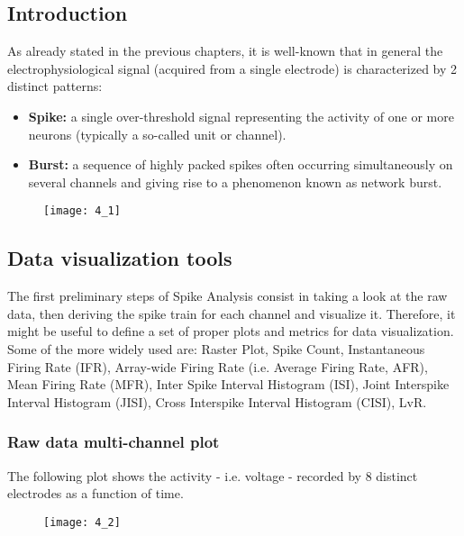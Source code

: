 \subsection{Introduction}
As already stated in the previous chapters, it is well-known that in general the electrophysiological
signal (acquired from a single electrode) is characterized by 2 distinct patterns:
\begin{itemize}
    \item \textbf{Spike:} a single over-threshold signal representing the activity of one or
          more neurons (typically a so-called unit or channel).
    \item \textbf{Burst:} a sequence of highly packed spikes often occurring simultaneously on
          several channels and giving rise to a phenomenon known as network burst.
\end{itemize}
\begin{figure}[H]
    \texttt{[image: 4\_1]}
    \centering
\end{figure}


\subsection{Data visualization tools}
The first preliminary steps of Spike Analysis consist in taking a look at the raw data, then
deriving the spike train for each channel and visualize it. Therefore, it might be useful to define
a set of proper plots and metrics for data visualization. Some of the more widely used are: Raster Plot, Spike Count, Instantaneous Firing Rate (IFR), Array-wide Firing Rate (i.e. Average Firing Rate, AFR), Mean Firing Rate (MFR), Inter Spike Interval Histogram (ISI), Joint Interspike Interval Histogram (JISI), Cross Interspike Interval Histogram (CISI), LvR. 
\subsubsection{Raw data multi-channel plot}
The following plot shows the activity - i.e. voltage - recorded by 8 distinct electrodes as a function of time.
\begin{figure}[H]
    \texttt{[image: 4\_2]}
    \centering
\end{figure}

